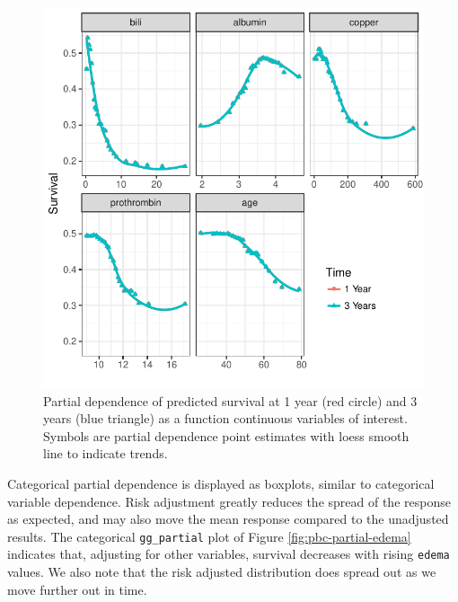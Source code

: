 \documentclass[article]{jss}
\begin{document}
\begin{Schunk}
\begin{figure}[!htb]

{\centering \includegraphics{fig-rfs/rfs-pbc-partial-panel-1} 

}

\caption[Partial dependence of predicted survival at 1 year (red circle) and 3 years (blue triangle) as a function continuous variables of interest]{Partial dependence of predicted survival at 1 year (red circle) and 3 years (blue triangle) as a function continuous variables of interest. Symbols are partial dependence point estimates with loess smooth line to indicate trends.}\label{fig:pbc-partial-panel}
\end{figure}
\end{Schunk}

Categorical partial dependence is displayed as boxplots, similar to
categorical variable dependence. Risk adjustment greatly reduces the
spread of the response as expected, and may also move the mean response
compared to the unadjusted results. The categorical \texttt{gg\_partial}
plot of Figure \ref{fig:pbc-partial-edema} indicates that, adjusting for
other variables, survival decreases with rising \texttt{edema} values.
We also note that the risk adjusted distribution does spread out as we
move further out in time.
\end{document}

